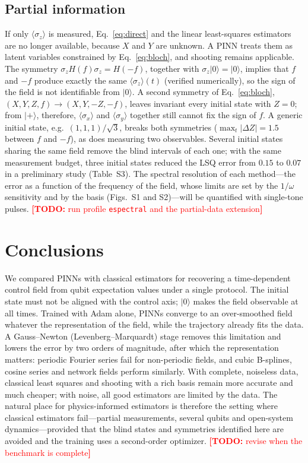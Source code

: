 \documentclass[aps,pra,twocolumn,superscriptaddress,10pt,longbibliography,floatfix]{revtex4-2}
\newif\ifshowtodos \showtodostrue
\newcommand{\TODO}[1]{\ifshowtodos\textcolor{red}{\textbf{[TODO:} #1\textbf{]}}\fi}
\begin{document}
\subsection{Partial information}\label{sec:partial}
If only $\langle\sigma_z\rangle$ is measured, Eq.~\eqref{eq:direct} and the linear least-squares
estimators are no longer available, because $X$ and $Y$ are unknown. A PINN treats them as latent
variables constrained by Eq.~\eqref{eq:bloch}, and shooting remains applicable. The symmetry
$\sigma_zH(f)\sigma_z=H(-f)$, together with $\sigma_z|0\rangle=|0\rangle$, implies that $f$ and $-f$
produce exactly the same $\langle\sigma_z\rangle(t)$ (verified numerically), so the sign of the field is
not identifiable from $|0\rangle$. A second symmetry of Eq.~\eqref{eq:bloch},
$(X,Y,Z,f)\to(X,Y,-Z,-f)$, leaves invariant every initial state with $Z=0$; from $|+\rangle$, therefore,
$\langle\sigma_x\rangle$ and $\langle\sigma_y\rangle$ together still cannot fix the sign of $f$.
A generic initial state, e.g.\ $(1,1,1)/\sqrt3$, breaks both symmetries ($\max_t|\Delta Z|=1.5$ between
$f$ and $-f$), as does measuring two observables. Several initial states sharing the same field remove
the blind intervals of each one; with the same measurement budget, three initial states reduced the LSQ
error from $0.15$ to $0.07$ in a preliminary study (Table~S3). The spectral resolution of each
method---the error as a function of the frequency of the field, whose limits are set by the $1/\omega$
sensitivity and by the basis (Figs.~S1 and S2)---will be quantified with single-tone pulses.
\TODO{run profile \texttt{espectral} and the partial-data extension}

\section{Conclusions}\label{sec:conclusions}

We compared PINNs with classical estimators for recovering a time-dependent control field from qubit
expectation values under a single protocol. The initial state must not be aligned with the control
axis; $|0\rangle$ makes the field observable at all times. Trained with Adam alone, PINNs converge to an
over-smoothed field whatever the representation of the field, while the trajectory already fits the
data. A Gauss--Newton (Levenberg--Marquardt) stage removes this limitation and lowers the error by two
orders of magnitude, after which the representation matters: periodic Fourier series fail for
non-periodic fields, and cubic B-splines, cosine series and network fields perform similarly. With
complete, noiseless data, classical least squares and shooting with a rich basis remain more accurate
and much cheaper; with noise, all good estimators are limited by the data. The natural place for
physics-informed estimators is therefore the setting where classical estimators fail---partial
measurements, several qubits and open-system dynamics---provided that the blind states and symmetries
identified here are avoided and the training uses a second-order optimizer.
\TODO{revise when the benchmark is complete}
\end{document}
